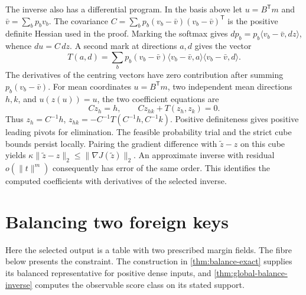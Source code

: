 \documentclass[11pt,a4paper]{article}
\theoremstyle{definition}
\theoremstyle{remark}\newaliascnt{remark}{theorem}
\numberwithin{equation}{section}
\begin{document}
The inverse also has a differential program. In the basis above let $u=B^{\mathsf{T}} m$ and $\bar v=\sum_b p_b v_b$. The covariance $C=\sum_b p_b(v_b-\bar v)(v_b-\bar v)^{\mathsf{T}}$ is the positive definite Hessian used in the proof. Marking the softmax gives $dp_b=p_b\langle v_b-\bar v,dz\rangle$, whence $du=C\,dz$. A second mark at directions $a,d$ gives the vector
\[
 T(a,d)=\sum_b p_b(v_b-\bar v)
       \langle v_b-\bar v,a\rangle\langle v_b-\bar v,d\rangle .
\]
The derivatives of the centring vectors have zero contribution after summing \(p_b(v_b-\bar v)\). For mean coordinates \(u=B^{\mathsf T}m\), two independent mean directions \(h,k\), and \(u(z(u))=u\), the two coefficient equations are
\[
 C z_h=h,\qquad C z_{hk}+T(z_h,z_k)=0 .
\]
Thus \(z_h=C^{-1}h\), \(z_{hk}=-C^{-1}T(C^{-1}h,C^{-1}k)\). Positive definiteness gives positive leading pivots for elimination. The feasible probability trial and the strict cube bounds persist locally. Pairing the gradient difference with \(\widetilde z-z\) on this cube yields
\(\kappa\|\widetilde z-z\|_2\le\|\nabla J(\widetilde z)\|_2\).
An approximate inverse with residual \(o(\|t\|^m)\) consequently has error of the same order. This identifies the computed coefficients with derivatives of the selected inverse.

\section{Balancing two foreign keys}\label{sec:balance}

Here the selected output is a table with two prescribed margin fields. The fibre below presents the constraint. The construction in \cref{thm:balance-exact} supplies its balanced representative for positive dense inputs, and \cref{thm:global-balance-inverse} computes the observable score class on its stated support.
\end{document}
